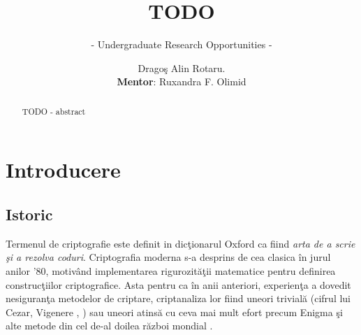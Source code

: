 \documentclass{llncs}
\begin{document}
\pagestyle{empty}
%
%
\title{TODO}
%
%
\subtitle{- Undergraduate Research Opportunities - }
\author{Drago\c{s} Alin Rotaru.\\{\small \textbf{Mentor}: Ruxandra F. Olimid}}
%



\maketitle              %

\begin{abstract}
TODO - abstract
\end{abstract}

\tableofcontents
\newpage

\section{Introducere}
\label{sec:intro}

\subsection{Istoric}
Termenul de criptografie este definit in dic\c{t}ionarul Oxford ca fiind \textit{arta de a scrie \c{s}i a rezolva coduri}.
Criptografia moderna s-a desprins de cea clasica \^{i}n jurul anilor '80, motiv\^{a}nd implementarea rigurozit\u{a}\c{t}ii matematice pentru definirea construc\c{t}iilor criptografice. Asta pentru ca \^{i}n anii anteriori, experien\c{t}a a dovedit nesiguran\c{t}a metodelor de criptare, criptanaliza lor fiind uneori trivial\u{a} (cifrul lui Cezar, Vigenere \cite{Caesar:2015}, \cite{Vigenere:2015}) sau uneori atins\u{a} cu ceva mai mult efort precum Enigma \c{s}i alte metode din cel de-al doilea r\u{a}zboi mondial \cite{Enigma:2015}.
\end{document}
